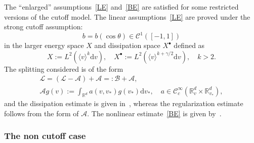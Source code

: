 \documentclass[AHL,Unicode,longabstracts,published]{cedram}
\renewcommand{\d}{\mathrm{d}}
\newcommand{\R}{\mathbb{R}}
\renewcommand{\AA}{\mathcal{A}}
\newcommand{\BB}{\mathcal{B}}
\newcommand{\CC}{\mathcal{C}}
\newcommand{\LL}{\mathcal{L}}
\newcommand{\Sl}{X}
\newcommand{\Slp}{X^{\bullet}}
\newcommand{\la}{\langle}
\newcommand{\ra}{\rangle}
\begin{document}
The ``enlarged'' assumptions~\eqref{LE} and~\eqref{BE} are satisfied for some restricted versions of the cutoff model. The linear assumptions~\eqref{LE} are proved under the strong cutoff assumption:
\[
b =b(\cos \theta) \in \CC^1\left([-1, 1] \right)
\]
in the larger energy space $\Sl$ and dissipation space $\Slp$ defined as
\[
\Sl := L^2\left(\la v \ra^k \d v \right), \quad \Slp := L^2\left(\la v \ra^{k+\gamma/2} \d v\right), \quad k > 2.
\]
The splitting considered is of the form
\begin{gather*}
\LL = (\LL - \AA) + \AA =: \BB+ \AA,\\
\AA g(v) := \int_{\R^d} a(v, v_*) g(v_*) \d v_*, \quad a \in \CC^\infty_c\left(\R^d_v \times \R^d_{v_*} \right),
\end{gather*}
and the dissipation estimate is given in~\cite[Lemma~3.4]{BMM2019}, whereas the regularization estimate follows from the form of $\AA$. The nonlinear estimate~\ref{BE} is given by~\cite[Lemma~4.4]{BMM2019}.

\subsubsection{The non cutoff case}
\end{document}
